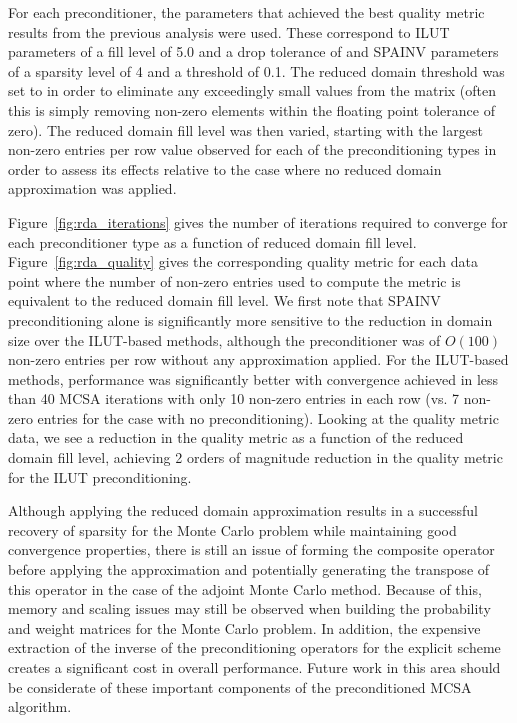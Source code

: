 For each preconditioner, the parameters that achieved the best quality
metric results from the previous analysis were used. These correspond
to ILUT parameters of a fill level of 5.0 and a drop tolerance of
 and SPAINV parameters of a sparsity level of 4 and a
threshold of 0.1. The reduced domain threshold was set to 
in order to eliminate any exceedingly small values from the matrix
(often this is simply removing non-zero elements within the floating
point tolerance of zero). The reduced domain fill level was then
varied, starting with the largest non-zero entries per row value
observed for each of the preconditioning types in order to assess its
effects relative to the case where no reduced domain approximation was
applied.

Figure~\ref{fig:rda_iterations} gives the number of iterations
required to converge for each preconditioner type as a function of
reduced domain fill level. Figure~\ref{fig:rda_quality} gives the
corresponding quality metric for each data point where the number of
non-zero entries used to compute the metric is equivalent to the
reduced domain fill level. We first note that SPAINV preconditioning
alone is significantly more sensitive to the reduction in domain size
over the ILUT-based methods, although the preconditioner was of
$O(100)$ non-zero entries per row without any approximation
applied. For the ILUT-based methods, performance was significantly
better with convergence achieved in less than 40 MCSA iterations with
only 10 non-zero entries in each row (vs. 7 non-zero entries for the
case with no preconditioning). Looking at the quality metric data, we
see a reduction in the quality metric as a function of the reduced
domain fill level, achieving 2 orders of magnitude reduction in the
quality metric for the ILUT preconditioning.

Although applying the reduced domain approximation results in a
successful recovery of sparsity for the Monte Carlo problem while
maintaining good convergence properties, there is still an issue of
forming the composite operator before applying the approximation and
potentially generating the transpose of this operator in the case of
the adjoint Monte Carlo method. Because of this, memory and scaling
issues may still be observed when building the probability and weight
matrices for the Monte Carlo problem. In addition, the expensive
extraction of the inverse of the preconditioning operators for the
explicit scheme creates a significant cost in overall
performance. Future work in this area should be considerate of these
important components of the preconditioned MCSA algorithm.

